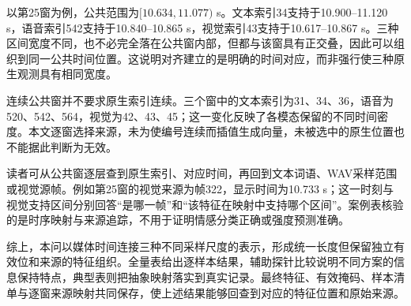 

以第25窗为例，公共范围为$[10.634,11.077)$ s。文本索引34支持于10.900--11.120 s，语音索引542支持于10.840--10.865 s，视觉索引43支持于10.617--10.867 s。三种区间宽度不同，也不必完全落在公共窗内部，但都与该窗具有正交叠，因此可以组织到同一公共时间位置。这说明对齐建立的是明确的时间对应，而非强行使三种原生观测具有相同宽度。

连续公共窗并不要求原生索引连续。三个窗中的文本索引为31、34、36，语音为520、542、564，视觉为42、43、45；这一变化反映了各模态保留的不同时间密度。本文逐窗选择来源，未为使编号连续而插值生成向量，未被选中的原生位置也不能据此判断为无效。

读者可从公共窗逐层查到原生索引、对应时间，再回到文本词语、WAV采样范围或视觉源帧。例如第25窗的视觉来源为帧322，显示时间为10.733 s；这一时刻与视觉支持区间分别回答“是哪一帧”和“该特征在映射中支持哪个区间”。案例表核验的是时序映射与来源追踪，不用于证明情感分类正确或强度预测准确。

综上，本问以媒体时间连接三种不同采样尺度的表示，形成统一长度但保留独立有效位和来源的特征组织。全量表给出逐样本结果，辅助探针比较说明不同方案的信息保持特点，典型表则把抽象映射落实到真实记录。最终特征、有效掩码、样本清单与逐窗来源映射共同保存，使上述结果能够回查到对应的特征位置和原始来源。
\FloatBarrier
